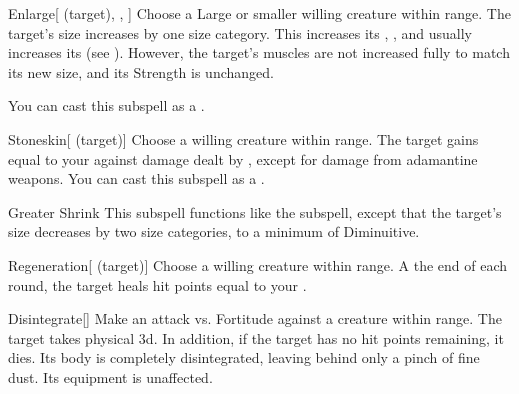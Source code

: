 \begin{ability}[\nth{3}]{Enlarge}[ (target), , ]
Choose a Large or smaller willing creature within \rngclose range.
The target's size increases by one size category.
This increases its , , and usually increases its  (see ).
However, the target's muscles are not increased fully to match its new size, and its Strength is unchanged.

You can cast this subspell as a .
\end{ability}
\vspace{0.25em}


\begin{ability}[\nth{3}]{Stoneskin}[ (target)]
Choose a willing creature within \rngclose range.
The target gains  equal to your  against damage dealt by , except for damage from adamantine weapons.
You can cast this subspell as a .
\end{ability}
\vspace{0.25em}


\begin{ability}[\nth{4}]{Greater Shrink}
This subspell functions like the  subspell, except that the target's size decreases by two size categories, to a minimum of Diminuitive.
\end{ability}
\vspace{0.25em}


\begin{ability}[\nth{4}]{Regeneration}[ (target)]
Choose a willing creature within \rngclose range.
A the end of each round, the target heals hit points equal to your .
\end{ability}
\vspace{0.25em}


\begin{ability}[\nth{5}]{Disintegrate}[]
Make an attack vs. Fortitude against a creature within \rngmed range.
\hit The target takes physical  \plus3d.
In addition, if the target has no hit points remaining, it dies.
Its body is completely disintegrated, leaving behind only a pinch of fine dust.
Its equipment is unaffected.
\end{ability}
\vspace{0.25em}



